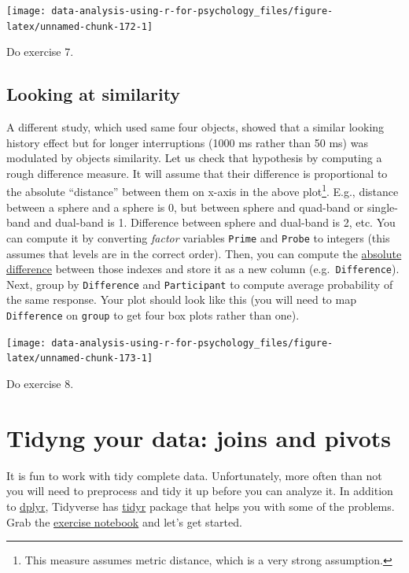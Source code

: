 \documentclass[
]{book}
\begin{document}
\begin{center}\texttt{[image: data-analysis-using-r-for-psychology\_files/figure-latex/unnamed-chunk-172-1]} \end{center}

Do exercise 7.

\hypertarget{looking-at-similarity}{%
\section{Looking at similarity}\label{looking-at-similarity}}

A different study, which used same four objects, showed that a similar looking history effect but for longer interruptions (1000 ms rather than 50 ms) was modulated by objects similarity. Let us check that hypothesis by computing a rough difference measure. It will assume that their difference is proportional to the absolute ``distance'' between them on x-axis in the above plot\footnote{This measure assumes metric distance, which is a very strong assumption.}. E.g., distance between a sphere and a sphere is 0, but between sphere and quad-band or single-band and dual-band is 1. Difference between sphere and dual-band is 2, etc. You can compute it by converting \emph{factor} variables \texttt{Prime} and \texttt{Probe} to integers (this assumes that levels are in the correct order). Then, you can compute the \href{https://stat.ethz.ch/R-manual/R-devel/library/base/html/MathFun.html}{absolute difference} between those indexes and store it as a new column (e.g.~\texttt{Difference}). Next, group by \texttt{Difference} and \texttt{Participant} to compute average probability of the same response. Your plot should look like this (you will need to map \texttt{Difference} on \texttt{group} to get four box plots rather than one).

\begin{center}\texttt{[image: data-analysis-using-r-for-psychology\_files/figure-latex/unnamed-chunk-173-1]} \end{center}

Do exercise 8.

\hypertarget{tyding}{%
\chapter{Tidyng your data: joins and pivots}\label{tyding}}

It is fun to work with tidy complete data. Unfortunately, more often than not you will need to preprocess and tidy it up before you can analyze it. In addition to \href{https://dplyr.tidyverse.org/}{dplyr}, Tidyverse has \href{https://tidyr.tidyverse.org/}{tidyr} package that helps you with some of the problems. Grab the \href{notebooks/Seminar\%2008\%20-\%20tidyr.Rmd}{exercise notebook} and let's get started.
\end{document}
